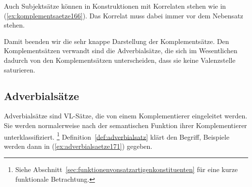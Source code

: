 \begin{exe}
  \ex\label{ex:komplementsaetze162}
  \begin{xlist}
  \end{xlist}
\end{exe}

Auch Subjektsätze können in Konstruktionen mit Korrelaten stehen wie in (\ref{ex:komplementsaetze166}).
Das Korrelat muss dabei immer vor dem Nebensatz stehen.

\Enl

\begin{exe}
  \ex\label{ex:komplementsaetze166}
  \begin{xlist}
  \end{xlist}
\end{exe}

Damit beenden wir die sehr knappe Darstellung der Komplementsätze.
Den Komplementsätzen verwandt sind die Adverbialsätze, die sich im Wesentlichen dadurch von den Komplementsätzen unterscheiden, dass sie keine Valenzstelle saturieren.

\subsection{Adverbialsätze}
\label{sec:adverbialsaetze}


Adverbialsätze sind VL-Sätze, die von einem Komplementierer eingeleitet werden.
Sie werden normalerweise nach der semantischen Funktion ihrer Komplementierer unterklassifiziert.%
\footnote{Siehe Abschnitt~\ref{sec:funktionenvonsatzartigenkonstituenten} für eine kurze funktionale Betrachtung.}
Definition~\ref{def:adverbialsatz} klärt den Begriff, Beispiele werden dann in (\ref{ex:adverbialsaetze171}) gegeben.


